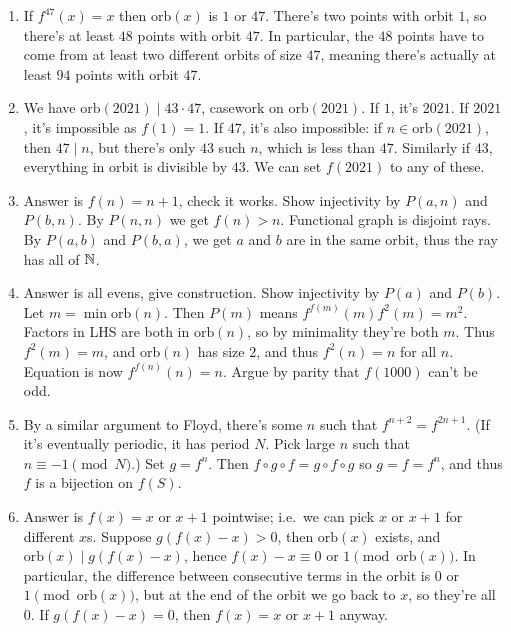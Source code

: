 \documentclass[11pt,paper=letter]{scrartcl}
\newcommand{\orb}[1]{\mathrm{orb}(#1)}
\begin{document}
\begin{enumerate}

\item If $f^{47}(x) = x$ then $\orb{x}$ is $1$ or $47$. There's two points with orbit $1$, so there's at least $48$ points with orbit $47$. In particular, the $48$ points have to come from at least two different orbits of size $47$, meaning there's actually at least $94$ points with orbit $47$.

\item We have $\orb{2021} \mid 43 \cdot 47$, casework on $\orb{2021}$. If $1$, it's $2021$. If $2021$, it's impossible as $f(1) = 1$. If $47$, it's also impossible: if $n \in \orb{2021}$, then $47 \mid n$, but there's only $43$ such $n$, which is less than $47$. Similarly if $43$, everything in orbit is divisible by $43$. We can set $f(2021)$ to any of these.

\item Answer is $f(n) = n + 1$, check it works. Show injectivity by $P(a, n)$ and $P(b, n)$. By $P(n, n)$ we get $f(n) > n$. Functional graph is disjoint rays. By $P(a, b)$ and $P(b, a)$, we get $a$ and $b$ are in the same orbit, thus the ray has all of $\mathbb N$.

\item Answer is all evens, give construction. Show injectivity by $P(a)$ and $P(b)$. Let $m = \min \orb{n}$. Then $P(m)$ means $f^{f(m)}(m)f^2(m) = m^2$. Factors in LHS are both in $\orb{n}$, so by minimality they're both $m$. Thus $f^2(m) = m$, and $\orb{n}$ has size $2$, and thus $f^2(n) = n$ for all $n$. Equation is now $f^{f(n)}(n) = n$. Argue by parity that $f(1000)$ can't be odd.

\item By a similar argument to Floyd, there's some $n$ such that $f^{n+2} = f^{2n+1}$. (If it's eventually periodic, it has period $N$. Pick large $n$ such that $n \equiv -1 \pmod N$.) Set $g = f^n$. Then $f \circ g \circ f = g \circ f \circ g$ so $g = f = f^n$, and thus $f$ is a bijection on $f(S)$.

\item Answer is $f(x) = x$ or $x + 1$ pointwise; i.e.\ we can pick $x$ or $x+1$ for different $x$s. Suppose $g(f(x) - x) > 0$, then $\orb{x}$ exists, and $\orb{x} \mid g(f(x) - x)$, hence $f(x) - x \equiv 0 \text{ or } 1 \pmod{\orb{x}}$. In particular, the difference between consecutive terms in the orbit is $0$ or $1 \pmod{\orb{x}}$, but at the end of the orbit we go back to $x$, so they're all $0$. If $g(f(x) - x) = 0$, then $f(x) = x$ or $x + 1$ anyway.


\end{enumerate}
\end{document}
